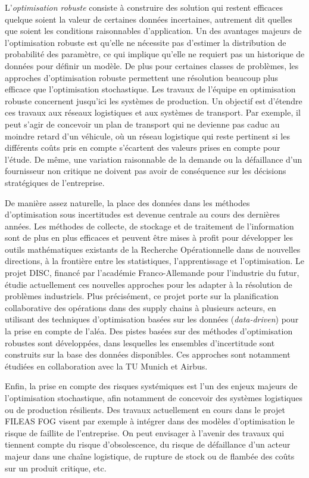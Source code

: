 	
	L'\textit{optimisation robuste} consiste à construire des solution qui restent efficaces  quelque soient la valeur de certaines données incertaines, autrement dit quelles que soient les conditions raisonnables d'application.
    Un des avantages majeurs de l'optimisation robuste est qu'elle ne nécessite pas d'estimer la distribution de probabilité des paramètre, ce qui implique qu'elle ne requiert pas un historique de données pour définir un modèle. De plus pour certaines classes de problèmes, les approches d'optimisation robuste permettent une résolution beaucoup plus efficace que l'optimisation stochastique. Les travaux de l'équipe en optimisation robuste concernent jusqu'ici les systèmes de production. Un objectif est d'étendre ces travaux aux réseaux logistiques et aux systèmes de transport. Par exemple, il peut s'agir de concevoir un plan de transport qui ne devienne pas caduc au moindre retard d'un véhicule, où un réseau logistique qui reste pertinent si les différents coûts pris en compte s'écartent des valeurs prises en compte pour l'étude. De même, une variation raisonnable de la demande ou la défaillance d'un fournisseur non critique ne doivent pas avoir de conséquence sur les décisions stratégiques de l'entreprise. 
    
    De manière assez naturelle, la place des données dans les méthodes d'optimisation sous incertitudes est devenue centrale au cours des dernières années. 
	Les méthodes de collecte, de stockage et de traitement de l'information sont de plus en plus efficaces et peuvent être mises à profit pour développer les outils mathématiques existants de la Recherche Opérationnelle dans de nouvelles directions, à la frontière entre les statistiques, l'apprentissage et l'optimisation. Le projet DISC, financé par l'académie Franco-Allemande pour l'industrie du futur, étudie actuellement ces nouvelles approches pour les adapter à la résolution de problèmes industriels. Plus précisément, ce projet porte sur la planification collaborative des opérations dans des supply chains à plusieurs acteurs, en utilisant des techniques d'optimisation basées sur les données (\textit{data-driven}) pour la prise en compte de l'aléa. Des pistes basées sur des méthodes d'optimisation robustes sont développées, dans lesquelles les ensembles d'incertitude sont construits sur la base des données disponibles. Ces approches sont notamment étudiées en collaboration avec la TU Munich et Airbus.
	
	Enfin, la prise en compte des risques systémiques est l'un des enjeux majeurs de l'optimisation stochastique, afin notamment de concevoir des systèmes logistiques ou de production résilients. Des travaux actuellement en cours dans le projet FILEAS FOG visent par exemple à intégrer dans des modèles d'optimisation le risque de faillite de l'entreprise. On peut envisager à l'avenir des travaux qui tiennent compte du risque d'obsolescence, du risque de défaillance d'un acteur majeur dans une chaîne logistique, de rupture de stock ou de flambée des coûts sur un produit critique, etc. 
	
